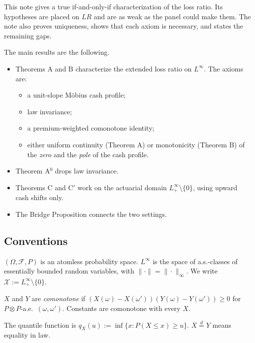 This note gives a true if-and-only-if characterization of the loss ratio. Its hypotheses are placed on $LR$ and are as weak as the panel could make them. The note also proves uniqueness, shows that each axiom is necessary, and states the remaining gaps.

The main results are the following.
\begin{itemize}
\item Theorems A and B characterize the extended loss ratio on $L^\infty$. The axioms are:
  \begin{itemize}
  \item a unit-slope M\"obius cash profile;
  \item law invariance;
  \item a premium-weighted comonotone identity;
  \item either uniform continuity (Theorem A) or monotonicity (Theorem B) of the \emph{zero} and the \emph{pole} of the cash profile.
  \end{itemize}
\item Theorem A$^0$ drops law invariance.
\item Theorems C and C$'$ work on the actuarial domain $L^\infty_+\setminus\{0\}$, using upward cash shifts only.
\item The Bridge Proposition connects the two settings.
\end{itemize}

\subsection{Conventions}

$(\Omega,\mathcal F,P)$ is an atomless probability space. $L^\infty$ is the space of a.s.-classes of essentially bounded random variables, with $\|\cdot\|=\|\cdot\|_\infty$. We write $\mathcal X:=L^\infty_+\setminus\{0\}$.

$X$ and $Y$ are \emph{comonotone} if $(X(\omega)-X(\omega'))(Y(\omega)-Y(\omega'))\ge 0$ for $P\otimes P$-a.e.\ $(\omega,\omega')$. Constants are comonotone with every $X$.

The quantile function is $q_X(u):=\inf\{x:P(X\le x)\ge u\}$. $X\overset{d}{=}Y$ means equality in law.

